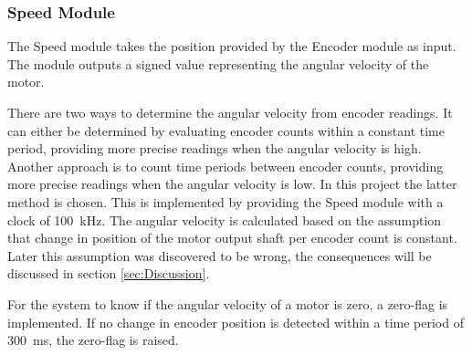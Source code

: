 \documentclass[../../main.tex]{subfiles}
\begin{document}



\subsubsection*{Speed Module}
The Speed module takes the position provided by the Encoder module as input. The module outputs a signed value representing the angular velocity of the motor. 

There are two ways to determine the angular velocity from encoder readings. It can either be determined by evaluating encoder counts within a constant time period, providing more precise readings when the angular velocity is high. Another approach is to count time periods between encoder counts, providing more precise readings when the angular velocity is low. In this project the latter method is chosen. This is implemented by providing the Speed module with a clock of \SI{100}{\kilo \hertz}. The angular velocity is calculated based on the assumption that change in position of the motor output shaft per encoder count is constant. Later this assumption was discovered to be wrong, the consequences will be discussed in section \ref{sec:Discussion}. 


For the system to know if the angular velocity of a motor is zero, a zero-flag is implemented. If no change in encoder position is detected within a time period of \SI{300}{\milli \second}, the zero-flag is raised.





 
\end{document}
